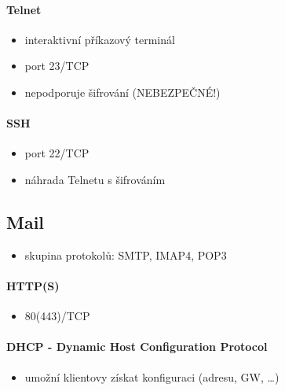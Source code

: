 \documentclass{szzclass}
\providecommand{\tightlist}{%
  \setlength{\itemsep}{0pt}\setlength{\parskip}{0pt}}
\begin{document}
\hypertarget{telnet}{%
\paragraph{Telnet}\label{telnet}}

\begin{itemize}
\tightlist
\item
  interaktivní příkazový terminál
\item
  port 23/TCP
\item
  nepodporuje šifrování (NEBEZPEČNÉ!)
\end{itemize}

\hypertarget{ssh}{%
\paragraph{SSH}\label{ssh}}

\begin{itemize}
\tightlist
\item
  port 22/TCP
\item
  náhrada Telnetu s šifrováním
\end{itemize}

\hypertarget{mail}{%
\subsection{Mail}\label{mail}}

\begin{itemize}
\tightlist
\item
  skupina protokolů: SMTP, IMAP4, POP3
\end{itemize}

\hypertarget{https}{%
\paragraph{HTTP(S)}\label{https}}

\begin{itemize}
\tightlist
\item
  80(443)/TCP
\end{itemize}

\hypertarget{dhcp---dynamic-host-configuration-protocol}{%
\paragraph{DHCP - Dynamic Host Configuration
Protocol}\label{dhcp---dynamic-host-configuration-protocol}}

\begin{itemize}
\tightlist
\item
  umožní klientovy získat konfiguraci (adresu, GW, \ldots)
\end{itemize}
\end{document}
